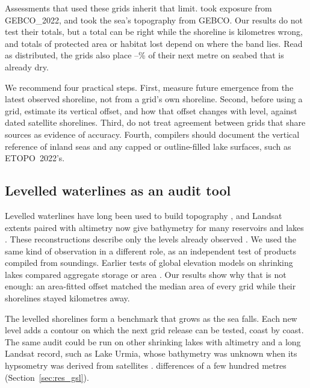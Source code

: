 Assessments that used these grids inherit that limit. \citet{court2025} took exposure from GEBCO\_2022, and \citet{duan2025} took the sea's topography from GEBCO. Our results do not test their totals, but a total can be right while the shoreline is kilometres wrong, and totals of protected area or habitat lost depend on where the band lies. Read as distributed, the grids also place --\% of their next metre on seabed that is already dry.


We recommend four practical steps. First, measure future emergence from the latest observed shoreline, not from a grid's own shoreline. Second, before using a grid, estimate its vertical offset, and how that offset changes with level, against dated satellite shorelines. Third, do not treat agreement between grids that share sources as evidence of accuracy. Fourth, compilers should document the vertical reference of inland seas and any capped or outline-filled lake surfaces, such as ETOPO~2022's.

\subsection{Levelled waterlines as an audit tool}
\label{sec:dis_tool}
Levelled waterlines have long been used to build topography \citep{mason1995,feng2011,sagar2017}, and Landsat extents paired with altimetry now give bathymetry for many reservoirs and lakes \citep{getirana2018,li2020,huang2025}. These reconstructions describe only the levels already observed \citep{li2020,huang2025}. We used the same kind of observation in a different role, as an independent test of products compiled from soundings. Earlier tests of global elevation models on shrinking lakes compared aggregate storage or area \citep{huang2026,bocharov2026}. Our results show why that is not enough: an area-fitted offset matched the median area of every grid while their shorelines stayed kilometres away.

The levelled shorelines form a benchmark that grows as the sea falls. Each new level adds a contour on which the next grid release can be tested, coast by coast. The same audit could be run on other shrinking lakes with altimetry and a long Landsat record, such as Lake Urmia, whose bathymetry was unknown when its hypsometry was derived from satellites \citep{sima2013}.  differences of a few hundred metres (Section~\ref{sec:res_gsl}).

